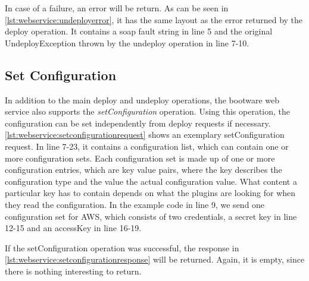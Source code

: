 In case of a failure, an error will be return.
As can be seen in \autoref{lst:webservice:undeployerror}, it has the same layout as the error returned by the deploy operation.
It contains a soap fault string in line 5 and the original UndeployException thrown by the undeploy operation in line 7-10.

\vspace*{\baselineskip}

\subsection{Set Configuration}

In addition to the main deploy and undeploy operations, the bootware web service also supports the \textit{setConfiguration} operation.
Using this operation, the configuration can be set independently from deploy requests if necessary.
\autoref{lst:webservice:setconfigurationrequest} shows an exemplary setConfiguration request.
In line 7-23, it contains a configuration list, which can contain one or more configuration sets.
Each configuration set is made up of one or more configuration entries, which are key value pairs, where the key describes the configuration type and the value the actual configuration value.
What content a particular key has to contain depends on what the plugins are looking for when they read the configuration.
In the example code in line 9, we send one configuration set for AWS, which consists of two credentials, a secret key in line 12-15 and an accessKey in line 16-19.

\vspace*{\baselineskip}

If the setConfiguration operation was successful, the response in \autoref{lst:webservice:setconfigurationresponse} will be returned.
Again, it is empty, since there is nothing interesting to return.

